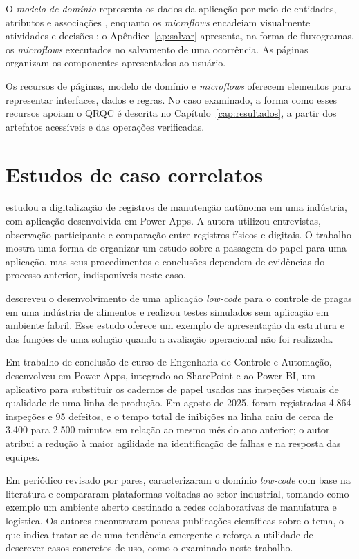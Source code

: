 O \emph{modelo de domínio} representa os dados da aplicação por meio de entidades, atributos e associações \cite{mendix2026domain}, enquanto os \textit{microflows} encadeiam visualmente atividades e decisões \cite{mendix2026microflows}; o Apêndice~\ref{ap:salvar} apresenta, na forma de fluxogramas, os \textit{microflows} executados no salvamento de uma ocorrência. As páginas organizam os componentes apresentados ao usuário.

Os recursos de páginas, modelo de domínio e \textit{microflows} oferecem elementos para representar interfaces, dados e regras. No caso examinado, a forma como esses recursos apoiam o QRQC é descrita no Capítulo~\ref{cap:resultados}, a partir dos artefatos acessíveis e das operações verificadas.

\section{Estudos de caso correlatos}

 estudou a digitalização de registros de manutenção autônoma em uma indústria, com aplicação desenvolvida em Power Apps. A autora utilizou entrevistas, observação participante e comparação entre registros físicos e digitais. O trabalho mostra uma forma de organizar um estudo sobre a passagem do papel para uma aplicação, mas seus procedimentos e conclusões dependem de evidências do processo anterior, indisponíveis neste caso.

 descreveu o desenvolvimento de uma aplicação \textit{low-code} para o controle de pragas em uma indústria de alimentos e realizou testes simulados sem aplicação em ambiente fabril. Esse estudo oferece um exemplo de apresentação da estrutura e das funções de uma solução quando a avaliação operacional não foi realizada.

Em trabalho de conclusão de curso de Engenharia de Controle e Automação,  desenvolveu em Power Apps, integrado ao SharePoint e ao Power BI, um aplicativo para substituir os cadernos de papel usados nas inspeções visuais de qualidade de uma linha de produção. Em agosto de 2025, foram registradas 4.864 inspeções e 95 defeitos, e o tempo total de inibições na linha caiu de cerca de 3.400 para 2.500 minutos em relação ao mesmo mês do ano anterior; o autor atribui a redução à maior agilidade na identificação de falhas e na resposta das equipes.

Em periódico revisado por pares,  caracterizaram o domínio \textit{low-code} com base na literatura e compararam plataformas voltadas ao setor industrial, tomando como exemplo um ambiente aberto destinado a redes colaborativas de manufatura e logística. Os autores encontraram poucas publicações científicas sobre o tema, o que indica tratar-se de uma tendência emergente e reforça a utilidade de descrever casos concretos de uso, como o examinado neste trabalho.

